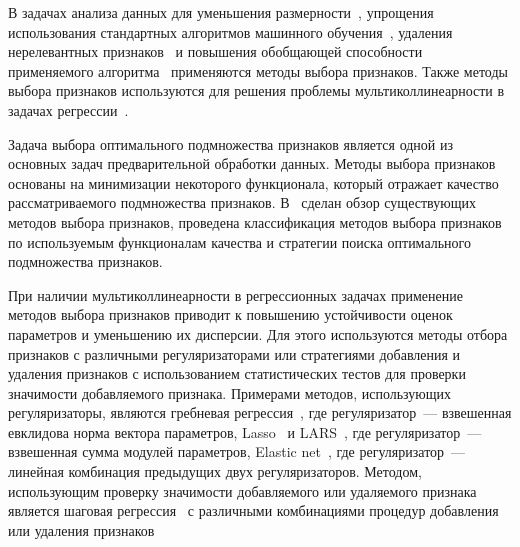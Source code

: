 \documentclass[a4paper,12pt]{article}
\theoremstyle{plain}
\begin{document}
В задачах анализа данных для уменьшения размерности~\cite{yu2003feature,strijov2012rankscale}, упрощения использования стандартных алгоритмов машинного обучения~\cite{chen2006combining}, удаления нерелевантных признаков~\cite{john1994irrelevant} и повышения обобщающей способности применяемого алгоритма~\cite{voron2008combprob} применяются методы выбора признаков. Также методы выбора признаков используются для решения проблемы мультиколлинеарности в задачах регрессии~\cite{performChong}. 

Задача выбора оптимального подмножества признаков является одной из основных задач предварительной обработки данных. Методы выбора признаков основаны на минимизации некоторого функционала, который отражает качество рассматриваемого подмножества признаков. В~\cite{introVariableFeatureSelection,
reviewFeatureSelectionOnSyntData,ladha2011feature} сделан обзор существующих методов выбора признаков, проведена классификация методов выбора признаков по используемым функционалам качества и стратегии поиска оптимального подмножества признаков. 

При наличии мультиколлинеарности в регрессионных задачах применение методов выбора признаков приводит к повышению устойчивости оценок параметров и уменьшению их дисперсии. 
Для этого используются методы отбора признаков с различными регуляризаторами или стратегиями добавления и удаления признаков с использованием статистических тестов для проверки значимости добавляемого признака. Примерами методов, использующих регуляризаторы, являются гребневая регрессия~\cite{ridge}, где регуляризатор~--- взвешенная евклидова норма вектора параметров, Lasso~\cite{lasso} и LARS~\cite{lars}, где регуляризатор~--- взвешенная сумма модулей параметров, Elastic net~\cite{elnet}, где регуляризатор~--- линейная комбинация предыдущих двух регуляризаторов. Методом, использующим проверку значимости добавляемого или удаляемого признака является шаговая регрессия~\cite{stepwise} с различными комбинациями процедур добавления или удаления признаков      
\end{document}
